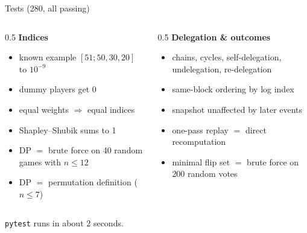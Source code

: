 \documentclass[aspectratio=169,11pt]{beamer}
\newcommand{\muted}[1]{\textcolor{ink2}{#1}}
\begin{document}
\begin{frame}{Tests (280, all passing)}
  \begin{columns}[T]
  \begin{column}{0.5\textwidth}
  \textbf{Indices}
  \begin{itemize}
    \item known example $[51;50,30,20]$ to $10^{-9}$
    \item dummy players get 0
    \item equal weights $\Rightarrow$ equal indices
    \item Shapley--Shubik sums to 1
    \item DP $=$ brute force on 40 random games with $n\le 12$
    \item DP $=$ permutation definition ($n\le 7$)
  \end{itemize}
  \end{column}
  \begin{column}{0.5\textwidth}
  \textbf{Delegation \& outcomes}
  \begin{itemize}
    \item chains, cycles, self-delegation, undelegation, re-delegation
    \item same-block ordering by log index
    \item snapshot unaffected by later events
    \item one-pass replay $=$ direct recomputation
    \item minimal flip set $=$ brute force on 200 random votes
  \end{itemize}
  \end{column}
  \end{columns}
  \vspace{1em}
  \muted{\texttt{pytest} runs in about 2 seconds.}
\end{frame}
\end{document}
